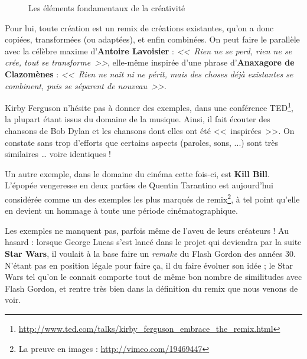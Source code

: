 \begin{figure}[H]
\caption{Les éléments fondamentaux de la créativité}
\end{figure}

Pour lui, toute création est un remix de créations existantes, qu'on a donc copiées, transformées (ou adaptées), et enfin combinées.
On peut faire le parallèle avec la célèbre maxime d'\textbf{Antoire Lavoisier} : \textit{<<~Rien ne se perd, rien ne se crée, tout se transforme~>>}, elle-même inspirée d'une phrase d'\textbf{Anaxagore de Clazomènes} : \textit{<<~Rien ne naît ni ne périt, mais des choses déjà existantes se combinent, puis se séparent de nouveau~>>}.


Kirby Ferguson n'hésite pas à donner des exemples, dans une conférence TED\footnote{\url{http://www.ted.com/talks/kirby_ferguson_embrace_the_remix.html}}, la plupart étant issus du domaine de la musique.
Ainsi, il fait écouter des chansons de Bob Dylan et les chansons dont elles ont été <<~inspirées~>>.
On constate sans trop d'efforts que certains aspects (paroles, sons, ...) sont très similaires \dots{} voire identiques !

Un autre exemple, dans le domaine du cinéma cette fois-ci, est \textbf{Kill Bill}.
L'épopée vengeresse en deux parties de Quentin Tarantino est aujourd'hui considérée comme un des exemples les plus marqués de remix\footnote{La preuve en images : \url{http://vimeo.com/19469447}}, à tel point qu'elle en devient un hommage à toute une période cinématographique.

Les exemples ne manquent pas, parfois même de l'aveu de leurs créateurs !
Au hasard : lorsque George Lucas s'est lancé dans le projet qui deviendra par la suite \textbf{Star Wars}, il voulait à la base faire un \textit{remake} du Flash Gordon des années 30.
N'étant pas en position légale pour faire ça, il du faire évoluer son idée ; le Star Wars tel qu'on le connait comporte tout de même bon nombre de similitudes avec Flash Gordon, et rentre très bien dans la définition du remix que nous venons de voir.

